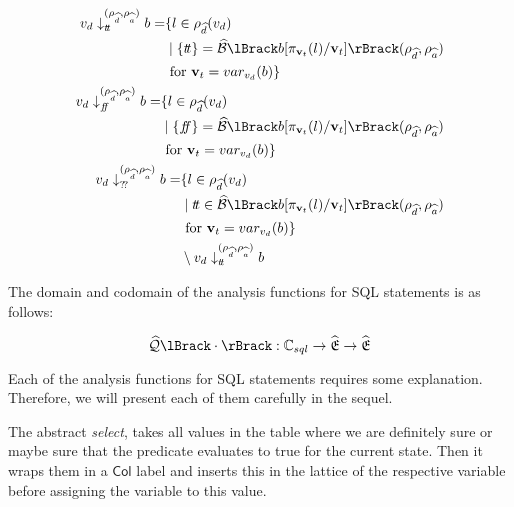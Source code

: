 \begin{align}
    \begin{split}
        v_d \downarrow_{\true}^{(\rho_{\ab{d}}, \rho_{\ab{a}})} b = &\{ l \in \rho_{\ab{d}}(v_d) \\
        &\mid \{ \true \} = \absboolsem{b[\pi_{\mathbf{v}_t}(l)/\mathbf{v}_t]}(\rho_{\ab{d}}, \rho_{\ab{a}}) \\
        &\text{ for } \mathbf{v}_t = var_{v_d}(b) \}
    \end{split}\\
    \begin{split}
        v_d \downarrow_{\false}^{(\rho_{\ab{d}}, \rho_{\ab{a}})} b = &\{ l \in \rho_{\ab{d}}(v_d) \\
        &\mid \{ \false \} = \absboolsem{b[\pi_{\mathbf{v}_t}(l)/\mathbf{v}_t]}(\rho_{\ab{d}}, \rho_{\ab{a}}) \\
        &\text{ for } \mathbf{v}_t = var_{v_d}(b) \}
    \end{split}\\
    \begin{split}
        v_d \downarrow_{\unknown}^{(\rho_{\ab{d}}, \rho_{\ab{a}})} b = &\{ l \in \rho_{\ab{d}}(v_d) \\
        &\mid \true \in \absboolsem{b[\pi_{\mathbf{v}_t}(l)/\mathbf{v}_t]}(\rho_{\ab{d}}, \rho_{\ab{a}}) \\
        &\text{ for } \mathbf{v}_t = var_{v_d}(b) \} \\
        &\setminus v_d \downarrow_{\true}^{(\rho_{\ab{d}}, \rho_{\ab{a}})} b
    \end{split}
\end{align}

The domain and codomain of the analysis functions for SQL statements is as follows:

\begin{equation}
    \abssqlsem{\cdot} : \mathbb{C}_{sql} \rightarrow \ab{\mathfrak{E}} \rightarrow \ab{\mathfrak{E}}\label{eq:equation-docomain-analysis}
\end{equation}

Each of the analysis functions for SQL statements requires some explanation.
Therefore, we will present each of them carefully in the sequel.

The abstract \textit{select}, takes all values in the table where we are definitely sure or maybe sure that the predicate evaluates to true for the current state.
Then it wraps them in a $\mathsf{Col}$ label and inserts this in the lattice of the respective variable before assigning the variable to this value.


